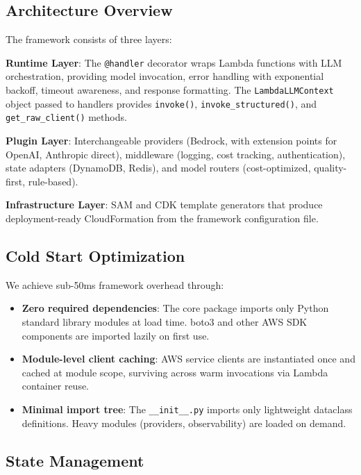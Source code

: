 \documentclass[11pt,a4paper]{article}
\begin{document}
\subsection{Architecture Overview}

The framework consists of three layers:

\textbf{Runtime Layer}: The \texttt{@handler} decorator wraps Lambda functions with LLM orchestration, providing model invocation, error handling with exponential backoff, timeout awareness, and response formatting. The \texttt{LambdaLLMContext} object passed to handlers provides \texttt{invoke()}, \texttt{invoke\_structured()}, and \texttt{get\_raw\_client()} methods.

\textbf{Plugin Layer}: Interchangeable providers (Bedrock, with extension points for OpenAI, Anthropic direct), middleware (logging, cost tracking, authentication), state adapters (DynamoDB, Redis), and model routers (cost-optimized, quality-first, rule-based).

\textbf{Infrastructure Layer}: SAM and CDK template generators that produce deployment-ready CloudFormation from the framework configuration file.

\subsection{Cold Start Optimization}

We achieve sub-50ms framework overhead through:

\begin{itemize}
    \item \textbf{Zero required dependencies}: The core package imports only Python standard library modules at load time. boto3 and other AWS SDK components are imported lazily on first use.
    \item \textbf{Module-level client caching}: AWS service clients are instantiated once and cached at module scope, surviving across warm invocations via Lambda container reuse.
    \item \textbf{Minimal import tree}: The \texttt{\_\_init\_\_.py} imports only lightweight dataclass definitions. Heavy modules (providers, observability) are loaded on demand.
\end{itemize}

\subsection{State Management}
\end{document}
